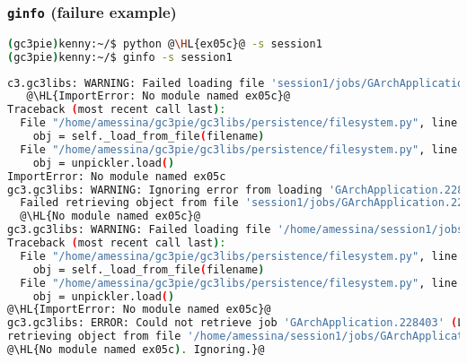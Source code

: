 \documentclass[english,serif,mathserif,xcolor=pdftex,dvipsnames,table]{beamer}
\begin{document}
\begin{frame}[fragile]
  \frametitle{\texttt{ginfo} (failure example)}
  \begin{lstlisting}[language=sh,basicstyle=\tt\tiny]
(gc3pie)kenny:~/$ python @\HL{ex05c}@ -s session1
(gc3pie)kenny:~/$ ginfo -s session1
\end{lstlisting}
\begin{lstlisting}[language=sh,basicstyle=\tt\tiny]
c3.gc3libs: WARNING: Failed loading file 'session1/jobs/GArchApplication.228403':
   @\HL{ImportError: No module named ex05c}@
Traceback (most recent call last):
  File "/home/amessina/gc3pie/gc3libs/persistence/filesystem.py", line 115, in load
    obj = self._load_from_file(filename)
  File "/home/amessina/gc3pie/gc3libs/persistence/filesystem.py", line 92, in _load_from_file
    obj = unpickler.load()
ImportError: No module named ex05c
gc3.gc3libs: WARNING: Ignoring error from loading 'GArchApplication.228403': 
  Failed retrieving object from file 'session1/jobs/GArchApplication.228403': @\HL{ImportError: }@
  @\HL{No module named ex05c}@
gc3.gc3libs: WARNING: Failed loading file '/home/amessina/session1/jobs/GArchApplication.228403': ImportError: No module named ex05c
Traceback (most recent call last):
  File "/home/amessina/gc3pie/gc3libs/persistence/filesystem.py", line 115, in load
    obj = self._load_from_file(filename)
  File "/home/amessina/gc3pie/gc3libs/persistence/filesystem.py", line 92, in _load_from_file
    obj = unpickler.load()
@\HL{ImportError: No module named ex05c}@
gc3.gc3libs: ERROR: Could not retrieve job 'GArchApplication.228403' (LoadError: Failed 
retrieving object from file '/home/amessina/session1/jobs/GArchApplication.228403': @\HL{ImportError: }@
@\HL{No module named ex05c). Ignoring.}@
  \end{lstlisting} %
\end{frame}
\end{document}
